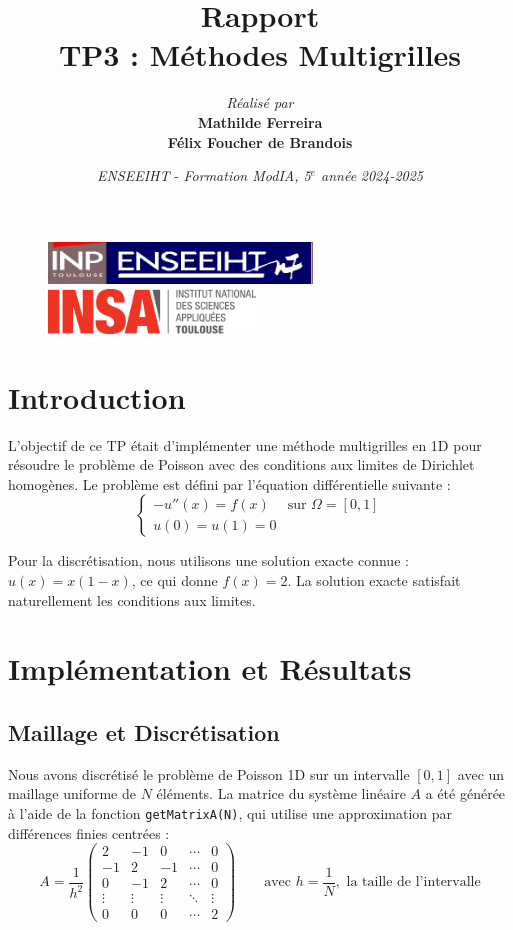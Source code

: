 \documentclass[12pt,a4paper]{article}
\title{\vspace{4cm}
        Rapport \\
        \vspace{1cm} \textbf{TP3 : Méthodes Multigrilles} \\ 
        \vspace{4cm} 
}
\author{\textit{Réalisé par} \vspace{0.5cm}\\
         \textbf{Mathilde Ferreira} \\
        \textbf{Félix Foucher de Brandois}
}
\date{\vfill
        \textit{ENSEEIHT} - 
        \textit{Formation ModIA, 5$^{e}$ année}
        \hfill
        \textit{2024-2025} \\
        \vspace{1cm}
}
\begin{document}
\begin{figure}[t]
    \centering
    \includegraphics[width=7cm]{src/inp_n7.png}
    \hfill
    \includegraphics[width=5.5cm]{src/insa_toulouse.png}
\end{figure}


\maketitle
\thispagestyle{empty}

\newpage


\section{Introduction}

L'objectif de ce TP était d'implémenter une méthode multigrilles en 1D pour résoudre le problème de Poisson avec des conditions aux limites de Dirichlet homogènes.
Le problème est défini par l'équation différentielle suivante :
\begin{equation}
    \begin{cases}
        -u''(x) = f(x) & \text{sur } \Omega = [0,1] \\
        u(0) = u(1) = 0
    \end{cases}
\end{equation}

Pour la discrétisation, nous utilisons une solution exacte connue : $u(x) = x(1-x)$, ce qui donne $f(x) = 2$.
La solution exacte satisfait naturellement les conditions aux limites.

\section{Implémentation et Résultats}

\subsection{Maillage et Discrétisation}

Nous avons discrétisé le problème de Poisson 1D sur un intervalle $[0,1]$ avec un maillage uniforme de $N$ éléments.
La matrice du système linéaire $A$ a été générée à l'aide de la fonction \texttt{getMatrixA(N)}, qui utilise une approximation par différences finies centrées :
$$
A = \frac{1}{h^2} \begin{pmatrix}
    2 & -1 & 0 & \cdots & 0 \\
    -1 & 2 & -1 & \cdots & 0 \\
    0 & -1 & 2 & \cdots & 0 \\
    \vdots & \vdots & \vdots & \ddots & \vdots \\
    0 & 0 & 0 & \cdots & 2
\end{pmatrix} \qquad \text{avec } h = \frac{1}{N}, \text{ la taille de l'intervalle}
$$
\end{document}
